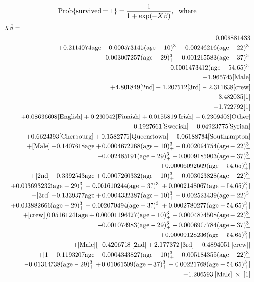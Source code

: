 \documentclass[]{interact}
\theoremstyle{plain}%
\theoremstyle{definition}
\theoremstyle{remark}
\begin{document}
\[{\rm Prob}\{{\rm survived}=1\} = \frac{1}{1+\exp(-X\beta)}, {\rm \ \ where} \\ \]
\begin{eqnarray*}
\small
\lefteqn{X\hat{\beta}=}\\
& & 0.008881433 \\
& & + 0.2114074    {\rm age}-0.000573145 ({\rm age}-10)_{+}^{3}+0.00246216   ({\rm age}-22)_{+}^{3}  \\
& &  -0.003007257 ({\rm age}-29)_{+}^{3}+0.001265583  ({\rm age}-37)_{+}^{3}  \\
& &   -0.0001473412({\rm age}-54.65)_{+}^{3}  \\
& &  -1.965745[{\rm Male}] \\
& &  +4.801849 [{\rm 2nd}]-1.207512[{\rm 3rd}]-2.311638[{\rm crew}] \\
& &  +3.482035[{\rm 1}] \\
& &  +1.722792[{\rm 1}] \\
& &  +0.08636608 [{\rm English}]+0.230042   [{\rm Finnish}]+0.0155819  [{\rm Irish}]-0.2309403 [{\rm Other}] \\
& &  -0.1927661 [{\rm Swedish}]-0.04923775[{\rm Syrian}] \\
& &  +0.6624393  [{\rm Cherbourg}]+0.1582776  [{\rm Queenstown}]-0.06188784[{\rm Southampton}] \\
& &  +[{\rm Male}][-0.1407618   {\rm age}+0.0004672268 ({\rm age}-10)_{+}^{3}-0.002094754 ({\rm age}-22)_{+}^{3}  \\
& &  +0.002485191  ({\rm age}-29)_{+}^{3}-0.0009185903({\rm age}-37)_{+}^{3}  \\
& &   +0.00006092609({\rm age}-54.65)_{+}^{3}  ] \\
& &  +[{\rm 2nd}][-0.3392543  {\rm age}+0.0007260332({\rm age}-10)_{+}^{3}-0.003023828({\rm age}-22)_{+}^{3}  \\
& &  +0.003693232 ({\rm age}-29)_{+}^{3}-0.001610244({\rm age}-37)_{+}^{3}+0.0002148067({\rm age}-54.65)_{+}^{3}  ] \\
& &  +[{\rm 3rd}][-0.1339377  {\rm age}+0.0004332387({\rm age}-10)_{+}^{3}-0.002523439({\rm age}-22)_{+}^{3}  \\
& &  +0.003882666 ({\rm age}-29)_{+}^{3}-0.002070494({\rm age}-37)_{+}^{3}+0.0002780277({\rm age}-54.65)_{+}^{3}  ] \\
& &  +[{\rm crew}][0.05161241   {\rm age}+0.00001196427({\rm age}-10)_{+}^{3}-0.0004874508({\rm age}-22)_{+}^{3}  \\
& &  +0.001074983  ({\rm age}-29)_{+}^{3}-0.0006907784({\rm age}-37)_{+}^{3}  \\
& &   +0.00009128236({\rm age}-54.65)_{+}^{3}  ] \\
& &  +[{\rm Male}][-0.4206718\:[{\rm 2nd}]+2.177372  \:[{\rm 3rd}]+0.4894051 \:[{\rm crew}] ] \\
& &  +[{\rm 1}][-0.1193207   {\rm age}-0.0004343827({\rm age}-10)_{+}^{3}+0.005184355  ({\rm age}-22)_{+}^{3}  \\
& &   -0.01314738  ({\rm age}-29)_{+}^{3}+0.01061509   ({\rm age}-37)_{+}^{3}-0.00221768  ({\rm age}-54.65)_{+}^{3}  ] \\
& &  -1.206593\:[{\rm Male}]\:\times\:[{\rm 1}] \\
\end{eqnarray*}
\end{document}
